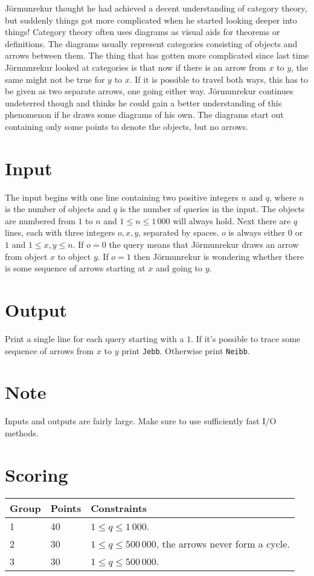 
Jörmunrekur thought he had achieved a decent understanding of category theory, but suddenly things got more complicated when he
started looking deeper into things! Category theory often uses diagrams as visual aids for theorems or definitions. The diagrams
usually represent categories consisting of objects and arrows between them. The thing that has gotten more complicated since last
time Jörmunrekur looked at categories is that now if there is an arrow from $x$ to $y$, the same might not be true for $y$ to $x$.
If it is possible to travel both ways, this has to be given as two separate arrows, one going either way. Jörmunrekur continues
undeterred though and thinks he could gain a better understanding of this phenomenon if he draws some diagrams of his own. The
diagrams start out containing only some points to denote the objects, but no arrows.

\section*{Input}
The input begins with one line containing two positive integers $n$ and $q$, where $n$ is the number of objects and $q$ is the
number of queries in the input. The objects are numbered from $1$ to $n$ and $1 \leq n \leq 1\,000$ will always hold. Next there are $q$
lines, each with three integers $o, x, y$, separated by spaces. $o$ is always either $0$ or $1$ and $1 \leq x, y \leq n$. If $o = 0$
the query means that Jörmunrekur draws an arrow from object $x$ to object $y$. If $o = 1$ then Jörmunrekur is wondering whether 
there is some sequence of arrows starting at $x$ and going to $y$.

\section*{Output}
Print a single line for each query starting with a $1$. If it's possible to trace some sequence of arrows from $x$ to $y$ print
\texttt{Jebb}. Otherwise print \texttt{Neibb}.

\section*{Note}
Inputs and outputs are fairly large. Make sure to use sufficiently fast I/O methods.

\section*{Scoring}
\begin{tabular}{|l|l|l|}
\hline
Group & Points & Constraints \\ \hline
1     & 40   & $1 \leq q \leq 1\,000$. \\ \hline
2     & 30   & $1 \leq q \leq 500\,000$, the arrows never form a cycle. \\ \hline
3     & 30   & $1 \leq q \leq 500\,000$. \\ \hline
\end{tabular}

